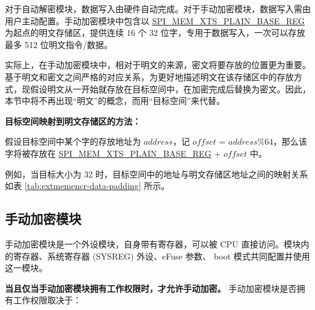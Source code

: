 \documentclass[main\_\_CN.tex]{subfiles}
\begin{document}
对于自动解密模块，数据写入由硬件自动完成。对于手动加密模块，数据写入需由用户主动配置。手动加密模块中包含以 \hyperref[regdesc:SPIMEMXTSPLAINBASEREG]{SPI\_MEM\_XTS\_PLAIN\_BASE\_REG} 为起点的明文存储区，提供连续 16 个 32 位字，专用于数据写入，一次可以存放最多 512 位明文指令/数据。

实际上，在手动加密模块中，相对于明文的来源，密文将要存放的位置更为重要。基于明文和密文之间严格的对应关系，为更好地描述明文在该存储区中的存放方式，现假设明文从一开始就存放在目标空间中，在加密完成后替换为密文。因此，本节中将不再出现“明文”的概念，而用“目标空间”来代替。

{\bfseries 目标空间映射到明文存储区的方法：}

假设目标空间中某个字的存放地址为 \begin{math} address \end{math}，记 \begin{math}offset\end{math} = \begin{math} address \% 64 \end{math}，那么该字将被存放在 \hyperref[regdesc:SPIMEMXTSPLAINBASEREG]{SPI\_MEM\_XTS\_PLAIN\_BASE\_REG} + \begin{math}offset\end{math} 中。

例如，当目标大小为 32 时，目标空间中的地址与明文存储区地址之间的映射关系如表 \ref{tab:extmemencr-data-padding} 所示。



\subsection{手动加密模块}

手动加密模块是一个外设模块，自身带有寄存器，可以被 CPU 直接访问。模块内的寄存器、系统寄存器 (SYSREG) 外设、eFuse 参数、 boot 模式共同配置并使用这一模块。

\textbf{ 当且仅当手动加密模块拥有工作权限时，才允许手动加密。}  手动加密模块是否拥有工作权限取决于：
\end{document}
